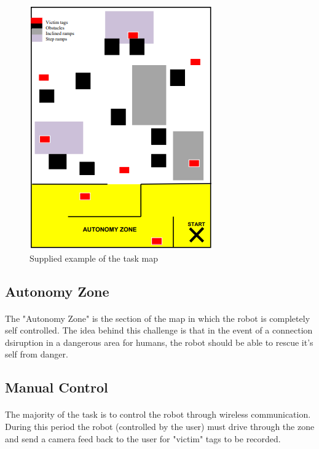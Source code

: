 \documentclass[12pt, a4paper]{article}
\begin{document}
\begin{figure}[h]
  \includegraphics{Images/AutonZone.png}
  \centering
  \caption{Supplied example of the task map}
  \label{fig:intro:map}
\end{figure}

\subsection{Autonomy Zone}
  \paragraph{}
    The "Autonomy Zone" is the section of the map in which the robot is completely self controlled. The idea behind this challenge is that in the event of a connection dsiruption in a dangerous area for humans, the robot should be able to rescue it's self from danger.

\subsection{Manual Control}
 \paragraph{}
    The majority of the task is to control the robot through wireless communication. During this period the robot (controlled by the user) must drive through the zone and send a camera feed back to the user for "victim" tags to be recorded.


\newpage
\end{document}

